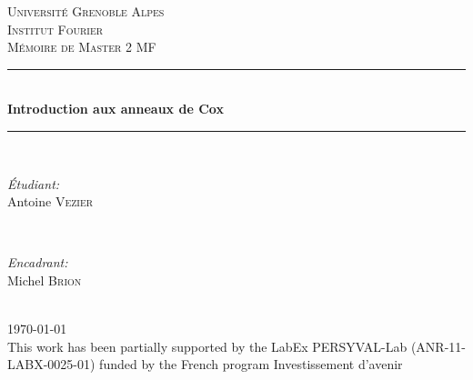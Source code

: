 \documentclass[oneside, 10pt]{book}
\begin{document}
\begin{titlepage}

\newcommand{\HRule}{\rule{\linewidth}{0.5mm}} %

\center

\textsc{\LARGE Université Grenoble Alpes}\\[0.5cm] 
\textsc{\large Institut Fourier}\\[1.5cm] 

\textsc{\Large Mémoire de Master 2 MF}\\[2.5cm] 

\HRule \\[0.4cm]
{ \huge \bfseries Introduction aux anneaux de Cox}\\[0.4cm] 
\HRule \\[1.5cm]

\begin{minipage}{0.4\textwidth}
\begin{flushleft} \large
\emph{Étudiant:}\\
Antoine \textsc{Vezier} 
\end{flushleft}
\end{minipage}
~
\begin{minipage}{0.4\textwidth}
\begin{flushright} \large
\emph{Encadrant:} \\
Michel \textsc{Brion} 
\end{flushright}
\end{minipage}\\[2cm]

{\large \today}\\[8cm] 


{\large This work has been partially supported by the LabEx PERSYVAL-Lab (ANR-11-LABX-0025-01) funded by the French program Investissement d’avenir
}\\[1cm] 

 
\vfill %

\end{titlepage}

\tableofcontents






\nocite{*}


\end{document}
